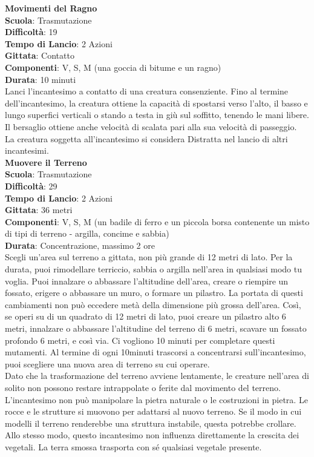 \begin{multicols}{2}
\medskip\textbf{Movimenti del Ragno}\\
\textbf{Scuola}: Trasmutazione\\
\textbf{Difficoltà}: 19\\
\textbf{Tempo di Lancio}: 2 Azioni\\
\textbf{Gittata}: Contatto\\
\textbf{Componenti}: V, S, M (una goccia di bitume e un ragno)\\
\textbf{Durata}: 10 minuti \\
Lanci l'incantesimo a contatto di una creatura consenziente. Fino al termine dell'incantesimo, la creatura ottiene la capacità di spostarsi verso l'alto, il basso e lungo superfici verticali o stando a testa in giù sul soffitto, tenendo le mani libere. Il bersaglio ottiene anche velocità di scalata pari alla sua velocità di passeggio.\\
La creatura soggetta all'incantesimo si considera Distratta nel lancio di altri incantesimi.\\

\medskip\textbf{Muovere il Terreno}\\
\textbf{Scuola}: Trasmutazione\\
\textbf{Difficoltà}: 29\\
\textbf{Tempo di Lancio}: 2 Azioni\\
\textbf{Gittata}: 36 metri\\
\textbf{Componenti}: V, S, M (un badile di ferro e un piccola borsa contenente un misto di tipi di terreno - argilla, concime e sabbia)\\
\textbf{Durata}: Concentrazione, massimo 2 ore\\
Scegli un'area sul terreno a gittata, non più grande di 12 metri di lato. Per la durata, puoi rimodellare terriccio, sabbia o argilla nell'area in qualsiasi modo tu voglia. Puoi innalzare o abbassare l'altitudine dell'area, creare o riempire un fossato, erigere o abbassare un muro, o formare un pilastro. La portata di questi cambiamenti non può eccedere metà della dimensione più grossa dell'area. Così, se operi su di un quadrato di 12 metri di lato, puoi creare un pilastro alto 6 metri, innalzare o abbassare l'altitudine del terreno di 6 metri, scavare un fossato profondo 6 metri, e così via. Ci vogliono 10 minuti per completare questi mutamenti. Al termine di ogni 10minuti trascorsi a concentrarsi sull'incantesimo, puoi scegliere una nuova area di terreno su cui operare.\\
Dato che la trasformazione del terreno avviene lentamente, le creature nell'area di solito non possono restare intrappolate o ferite dal movimento del terreno. L'incantesimo non può manipolare la pietra naturale o le costruzioni in pietra. Le rocce e le strutture si muovono per adattarsi al nuovo terreno. Se il modo in cui modelli il terreno renderebbe una struttura instabile, questa potrebbe crollare. Allo stesso modo, questo incantesimo non influenza direttamente la crescita dei vegetali. La terra smossa trasporta con sé qualsiasi vegetale presente.


\end{multicols}

